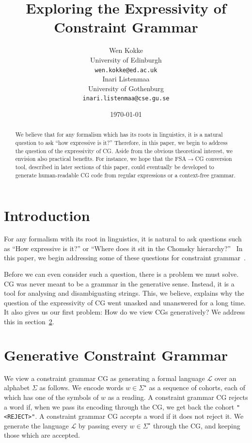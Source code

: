 \documentclass[11pt]{article}
\title{Exploring the Expressivity of Constraint Grammar}
\author{%
  Wen Kokke \\
  University of Edinburgh \\
  {\tt wen.kokke@ed.ac.uk} \\\And
  Inari Listenmaa \\
  University of Gothenburg \\
  {\tt inari.listenmaa@cse.gu.se} }
\date{\today}
\def\t#1{\texttt{#1}}
\begin{document}
\maketitle

\begin{abstract}
  We believe that for any formalism which has its roots in linguistics, it is a
  natural question to ask ``how expressive is it?'' Therefore, in this paper, we
  begin to address the question of the expressivity of CG.
  Aside from the obvious theoretical interest, we envision also practical
  benefits. For instance, we hope that the FSA$\rightarrow$CG conversion tool, described in
  later sections of this paper, could eventually be developed to generate
  human-readable CG code from regular expressions or a context-free grammar. 
\end{abstract}


\section{Introduction}
For any formalism with its root in linguistics, it is natural to ask questions
such as ``How expressive is it?'' or ``Where does it sit in the Chomsky
hierarchy?''~\cite{chomsky1956hierarchy}
In this paper, we begin addressing some of these questions for constraint
grammar~\cite[CG]{karlsson1995constraint}.

Before we can even consider such a question, there is a problem we must
solve. CG was never meant to be a grammar in the generative sense. Instead, it
is a tool for analysing and disambiguating strings.
This, we believe, explains why the question of the expressivity of CG went
unasked and unanswered for a long time.
It also gives us our first problem: How do we view CGs generatively?
We address this in section~\ref{sec:gencg}.


\section{Generative Constraint Grammar}\label{sec:gencg}
We view a constraint grammar CG as generating a formal language $\mathcal{L}$
over an alphabet $\Sigma$ as follows.
We encode words $w \in \Sigma^\star$ as a sequence of cohorts, each of which has
one of the symbols of $w$ as a reading.
A constraint grammar CG rejects a word if, when we pass its encoding through the
CG, we get back the cohort \t{"<REJECT>"}. A constraint grammar CG accepts a word
if it does not reject it.
We generate the language $\mathcal{L}$ by passing every $w \in \Sigma^\star$
through the CG, and keeping those which are accepted.
\end{document}
